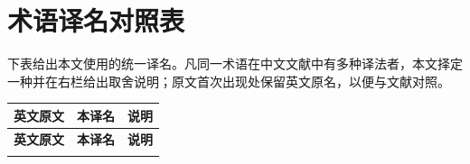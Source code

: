 \section*{术语译名对照表}

下表给出本文使用的统一译名。凡同一术语在中文文献中有多种译法者，本文择定一种并在右栏给出取舍说明；原文首次出现处保留英文原名，以便与文献对照。

\medskip
\noindent
\begin{longtable}{@{}p{}p{}p{}@{}}
\toprule
\textbf{英文原文} & \textbf{本译名} & \textbf{说明} \\
\midrule
\endfirsthead
\toprule
\textbf{英文原文} & \textbf{本译名} & \textbf{说明} \\
\midrule
\endhead
\bottomrule
\endfoot


\end{longtable}
